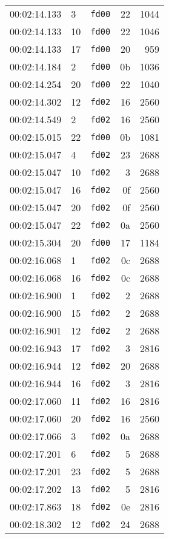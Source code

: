 \documentclass{article}
\begin{document}
\begin{longtable}{lllrr}
00:02:14.133 & 3 & \texttt{fd00} & 22 & 1044 \\
00:02:14.133 & 10 & \texttt{fd00} & 22 & 1046 \\
00:02:14.133 & 17 & \texttt{fd00} & 20 & 959 \\
00:02:14.184 & 2 & \texttt{fd00} & 0b & 1036 \\
00:02:14.254 & 20 & \texttt{fd00} & 22 & 1040 \\
00:02:14.302 & 12 & \texttt{fd02} & 16 & 2560 \\
00:02:14.549 & 2 & \texttt{fd02} & 16 & 2560 \\
00:02:15.015 & 22 & \texttt{fd00} & 0b & 1081 \\
00:02:15.047 & 4 & \texttt{fd02} & 23 & 2688 \\
00:02:15.047 & 10 & \texttt{fd02} & 3 & 2688 \\
00:02:15.047 & 16 & \texttt{fd02} & 0f & 2560 \\
00:02:15.047 & 20 & \texttt{fd02} & 0f & 2560 \\
00:02:15.047 & 22 & \texttt{fd02} & 0a & 2560 \\
00:02:15.304 & 20 & \texttt{fd00} & 17 & 1184 \\
00:02:16.068 & 1 & \texttt{fd02} & 0c & 2688 \\
00:02:16.068 & 16 & \texttt{fd02} & 0c & 2688 \\
00:02:16.900 & 1 & \texttt{fd02} & 2 & 2688 \\
00:02:16.900 & 15 & \texttt{fd02} & 2 & 2688 \\
00:02:16.901 & 12 & \texttt{fd02} & 2 & 2688 \\
00:02:16.943 & 17 & \texttt{fd02} & 3 & 2816 \\
00:02:16.944 & 12 & \texttt{fd02} & 20 & 2688 \\
00:02:16.944 & 16 & \texttt{fd02} & 3 & 2816 \\
00:02:17.060 & 11 & \texttt{fd02} & 16 & 2816 \\
00:02:17.060 & 20 & \texttt{fd02} & 16 & 2560 \\
00:02:17.066 & 3 & \texttt{fd02} & 0a & 2688 \\
00:02:17.201 & 6 & \texttt{fd02} & 5 & 2688 \\
00:02:17.201 & 23 & \texttt{fd02} & 5 & 2688 \\
00:02:17.202 & 13 & \texttt{fd02} & 5 & 2816 \\
00:02:17.863 & 18 & \texttt{fd02} & 0e & 2816 \\
00:02:18.302 & 12 & \texttt{fd02} & 24 & 2688 \\

\end{longtable}
\end{document}
